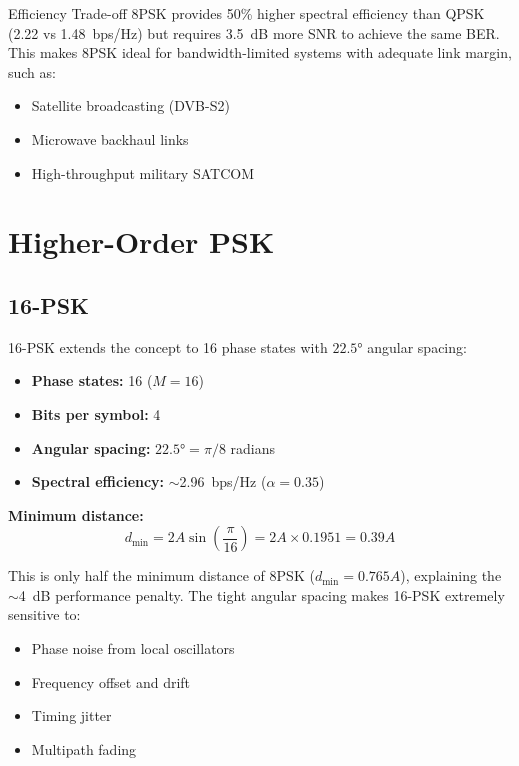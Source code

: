 \begin{calloutbox}{Efficiency Trade-off}
8PSK provides 50\% higher spectral efficiency than QPSK (2.22 vs 1.48~bps/Hz) but requires 3.5~dB more SNR to achieve the same BER. This makes 8PSK ideal for bandwidth-limited systems with adequate link margin, such as:
\begin{itemize}
\item Satellite broadcasting (DVB-S2)
\item Microwave backhaul links
\item High-throughput military SATCOM
\end{itemize}
\end{calloutbox}

\section{Higher-Order PSK}

\subsection{16-PSK}

16-PSK extends the concept to 16 phase states with $22.5°$ angular spacing:
\begin{itemize}
\item \textbf{Phase states:} 16 ($M = 16$)
\item \textbf{Bits per symbol:} 4
\item \textbf{Angular spacing:} $22.5° = \pi/8$ radians
\item \textbf{Spectral efficiency:} $\sim$2.96~bps/Hz ($\alpha = 0.35$)
\end{itemize}

\textbf{Minimum distance:}
\begin{equation}
d_{\min} = 2A\sin\left(\frac{\pi}{16}\right) = 2A \times 0.1951 = 0.39A
\end{equation}

This is only half the minimum distance of 8PSK ($d_{\min} = 0.765A$), explaining the $\sim$4~dB performance penalty. The tight angular spacing makes 16-PSK extremely sensitive to:
\begin{itemize}
\item Phase noise from local oscillators
\item Frequency offset and drift
\item Timing jitter
\item Multipath fading
\end{itemize}

